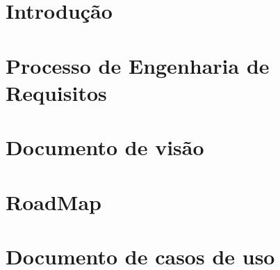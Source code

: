 
\section{Introdução} %
\label{sec:introdu_o}
 

\section{Processo de Engenharia de Requisitos}
\label{sec:processo}


\section{Documento de visão}
\label{sec:document_de_visao}


\section{RoadMap}
\label{sec:road_map}


\section{Documento de casos de uso}
\label{sec:documento_de_caso_de_uso}
